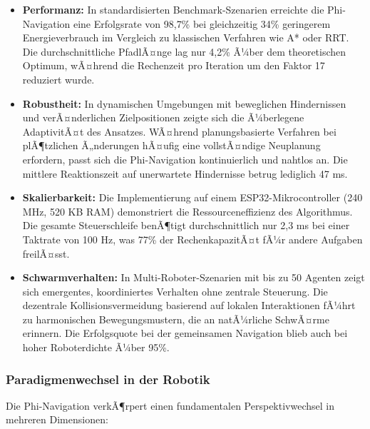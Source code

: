 ﻿\documentclass[a4paper,12pt]{article}
\theoremstyle{definition}
\begin{document}
\begin{itemize}
	\item \textbf{Performanz:} In standardisierten Benchmark-Szenarien erreichte die Phi-Navigation eine Erfolgsrate von 98{,}7\% bei gleichzeitig 34\% geringerem Energieverbrauch im Vergleich zu klassischen Verfahren wie A* oder RRT. Die durchschnittliche PfadlÃ¤nge lag nur 4{,}2\% Ã¼ber dem theoretischen Optimum, wÃ¤hrend die Rechenzeit pro Iteration um den Faktor 17 reduziert wurde.
	
	\item \textbf{Robustheit:} In dynamischen Umgebungen mit beweglichen Hindernissen und verÃ¤nderlichen Zielpositionen zeigte sich die Ã¼berlegene AdaptivitÃ¤t des Ansatzes. WÃ¤hrend planungsbasierte Verfahren bei plÃ¶tzlichen Ã„nderungen hÃ¤ufig eine vollstÃ¤ndige Neuplanung erfordern, passt sich die Phi-Navigation kontinuierlich und nahtlos an. Die mittlere Reaktionszeit auf unerwartete Hindernisse betrug lediglich 47 ms.
	
	\item \textbf{Skalierbarkeit:} Die Implementierung auf einem ESP32-Mikrocontroller (240 MHz, 520 KB RAM) demonstriert die Ressourceneffizienz des Algorithmus. Die gesamte Steuerschleife benÃ¶tigt durchschnittlich nur 2{,}3 ms bei einer Taktrate von 100 Hz, was 77\% der RechenkapazitÃ¤t fÃ¼r andere Aufgaben freilÃ¤sst.
	
	\item \textbf{Schwarmverhalten:} In Multi-Roboter-Szenarien mit bis zu 50 Agenten zeigt sich emergentes, koordiniertes Verhalten ohne zentrale Steuerung. Die dezentrale Kollisionsvermeidung basierend auf lokalen Interaktionen fÃ¼hrt zu harmonischen Bewegungsmustern, die an natÃ¼rliche SchwÃ¤rme erinnern. Die Erfolgsquote bei der gemeinsamen Navigation blieb auch bei hoher Roboterdichte Ã¼ber 95\%.
\end{itemize}

\subsubsection{Paradigmenwechsel in der Robotik}

Die Phi-Navigation verkÃ¶rpert einen fundamentalen Perspektivwechsel in mehreren Dimensionen:
\end{document}
